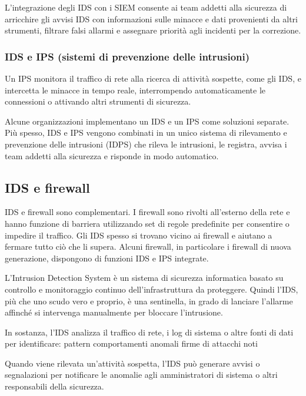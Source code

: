 L'integrazione degli IDS con i SIEM consente ai team addetti alla sicurezza di arricchire gli avvisi IDS con informazioni sulle 
minacce e dati provenienti da altri strumenti, filtrare falsi allarmi‌ e assegnare priorità agli incidenti per la correzione.


\subsubsection{IDS e IPS (sistemi di prevenzione delle intrusioni)}
Un IPS monitora il traffico di rete alla ricerca di attività sospette, come gli IDS, e intercetta le minacce in tempo reale, 
interrompendo automaticamente le connessioni o attivando altri strumenti di sicurezza.

Alcune organizzazioni implementano un IDS e un IPS come soluzioni separate. Più spesso, IDS e IPS vengono combinati in un unico 
sistema di rilevamento e prevenzione delle intrusioni (IDPS) che rileva le intrusioni, le registra, 
avvisa i team addetti alla sicurezza e risponde in modo automatico.

\subsection{IDS e firewall}
IDS e firewall sono complementari. 
I firewall sono rivolti all'esterno della rete e hanno funzione di barriera utilizzando set di 
regole predefinite per consentire o impedire il traffico. 
Gli IDS spesso si trovano vicino ai firewall e aiutano a fermare tutto ciò che li supera. 
Alcuni firewall, in particolare i firewall di nuova generazione, dispongono di funzioni IDS e IPS integrate.


L’Intrusion Detection System è un sistema di sicurezza informatica basato su controllo e monitoraggio continuo dell’infrastruttura da proteggere.
Quindi l’IDS, più che uno scudo vero e proprio, è una sentinella, in grado di lanciare l’allarme affinché si intervenga manualmente per bloccare l’intrusione.

In sostanza, l’IDS analizza il traffico di rete, i log di sistema o altre fonti di dati per identificare:
pattern
comportamenti anomali
firme di attacchi noti

Quando viene rilevata un’attività sospetta, l’IDS può generare avvisi o segnalazioni per notificare le 
anomalie agli amministratori di sistema o altri responsabili della sicurezza.

